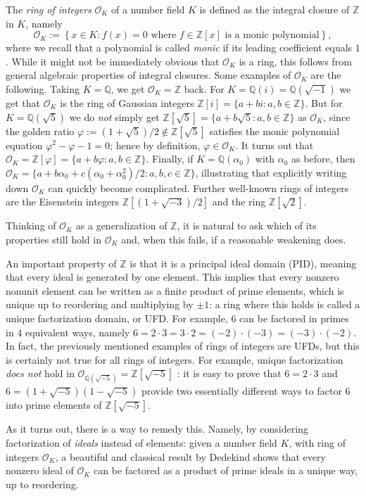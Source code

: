 \documentclass[sn-mathphys]{sn-jnl}%
\newcommand*{\OK}[1][K]{\mathcal{O}_{#1}}
\newcommand{\QQ}{\mathbb{Q}}
\renewcommand{\Z}{\mathbb{Z}}
\begin{document}
The \emph{ring of integers} $\OK$ of a number field $K$ is defined as the integral closure of $\Z$ in $K$, namely
\[
  \OK := \left\{x \in K : f(x)=0 \text{ where $f \in \Z[x]$ is a monic polynomial}\right\},\]
where we recall that a polynomial is called \emph{monic} if its leading coefficient equals $1$.
While it might not be immediately obvious that $\OK$ is a ring, this follows from general algebraic properties of integral closures.
Some examples of $\OK$ are the following. Taking $K=\QQ$, we get $\OK=\Z$ back.
For $K=\QQ(i)=\QQ(\sqrt{-1})$ we get that $\OK$ is the ring of Gaussian integers $\Z[i]=\{a+bi : a,b \in \Z\}$.
But for $K=\QQ(\sqrt{5})$ we do \emph{not} simply get $\Z[\sqrt{5}]=\{a+b\sqrt{5} : a,b \in \Z\}$ as $\OK$, since the golden ratio $\varphi:=(1+\sqrt{5})/2\not\in \Z[\sqrt{5}]$ satisfies the monic polynomial equation $\varphi^2-\varphi-1=0$; hence by definition, $\varphi \in \OK$.
It turns out that $\OK=\Z[\varphi]=\{a+b\varphi : a,b \in \Z\}$.
Finally, if $K=\QQ(\alpha_0)$ with $\alpha_0$ as before, then $\OK=\{a+b \alpha_0+c (\alpha_0+\alpha_0^2)/2 : a,b,c \in \Z\}$, illustrating that explicitly writing down $\OK$ can quickly become complicated.
Further well-known rings of integers are
the Eisenstein integers $\Z[(1+\sqrt{-3})/2]$ and the ring $\Z[\sqrt{2}]$.

Thinking of $\OK$ as a generalization of $\Z$, it is natural to ask which of its properties
still hold in $\OK$ and, when this fails, if a reasonable weakening does.

An important property of $\Z$ is that it is a principal ideal domain (PID), meaning that every ideal is generated by one element. This implies that every nonzero nonunit element can be written as a
finite product of prime elements, which is unique up to reordering and multiplying by $\pm 1$: a ring where this holds is called a unique factorization domain, or UFD.
For example, $6$ can be factored in primes in $4$ equivalent ways, namely $6=2\cdot 3=3\cdot2=(-2)\cdot (-3)=(-3) \cdot (-2)$.
In fact, the previously mentioned examples of rings of integers are UFDs, but this is certainly not true for all rings of integers. For example, unique factorization \emph{does not} hold in $\mathcal{O}_{\QQ(\sqrt{-5})}=\Z[\sqrt{-5}]$
: it is easy to prove that $6=2\cdot3$ and $6=(1+\sqrt{-5}) (1-\sqrt{-5})$ provide two essentially different ways to factor $6$ into prime elements of $\Z[\sqrt{-5}]$.

As it turns out, there is a way to remedy this. Namely, by considering factorization of \emph{ideals} instead of elements: given a number field $K$, with ring of integers $\OK$, a beautiful and classical result by Dedekind shows that every nonzero ideal of $\OK$ can be factored as a product of prime ideals in a unique way, up to reordering.
\end{document}
